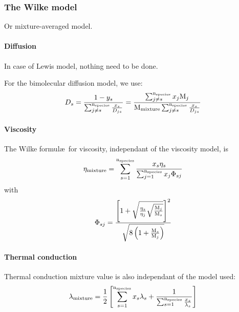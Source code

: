 \subsubsection{The Wilke model}
Or mixture-averaged model.

\paragraph{Diffusion}
In case of Lewis model, nothing need to be done.

For the bimolecular diffusion model, we use:
\begin{equation}
\diff[s] = \frac{1-\massfrac[s]}{\sum_{j\ne s}^{\nspecies}\frac{\molarfrac[s]}{\diff[js]}}
         = \frac{\sum_{j\neq s}^{\nspecies}\molarfrac[j]\Mm[j]}{\Mm[\text{mixture}]\sum_{j\ne s}^{\nspecies}\frac{\molarfrac[s]}{\diff[js]}}
\label{Wilke:diff}
\end{equation}

\paragraph{Viscosity} The Wilke formul\ae\ for viscosity, independant of
the viscosity model, is
\begin{equation}
\vis[\text{mixture}] = \sum_{s=1}^{\nspecies} \frac{\molarfrac[s]\vis[s]}{\sum_{j=1}^{\nspecies}\molarfrac[j]\Phi_{sj}}
\label{Wilke:viscosity}
\end{equation}
with
\begin{equation}
\Phi_{sj} = \frac{
                \left[
                     1 + \sqrt{\frac{\vis[s]}{\vis[j]}\sqrt{\frac{\Mm[j]}{\Mm[s]}}}
                \right]^2
                }{\sqrt{8\left(1 + \frac{\Mm[s]}{\Mm[j]}\right)}}
\label{Wilke:viscosity:Phi}
\end{equation}

\paragraph{Thermal conduction}
Thermal conduction mixture value is also independant of
the model used:
\begin{equation}
\thermcond[\text{mixture}] = \frac{1}{2} \left[
                                                \sum_{s=1}^{\nspecies} \molarfrac[s]\thermcond[s] + 
                                                \frac{1}{\sum_{s=1}^{\nspecies} \frac{\molarfrac[s]}{\thermcond[s]}}
                                        \right]
\label{Wilke:therm_cond}
\end{equation}
